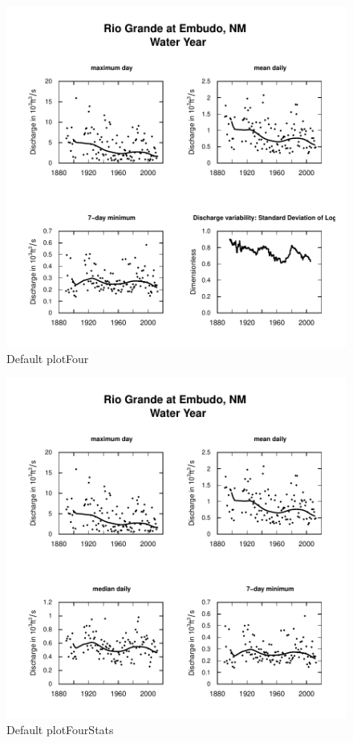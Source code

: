 \documentclass[a4paper,11pt]{article}
\begin{document}
\begin{figure}[ht]
\begin{center}

\includegraphics{EGRET-figplotFour}
\end{center}
\caption{Default plotFour}
\label{fig:plotFour}
\end{figure}


\begin{figure}[ht]
\begin{center}

\includegraphics{EGRET-figplotFourStats}
\end{center}
\caption{Default plotFourStats}
\label{fig:plotFourStats}
\end{figure}
\end{document}

